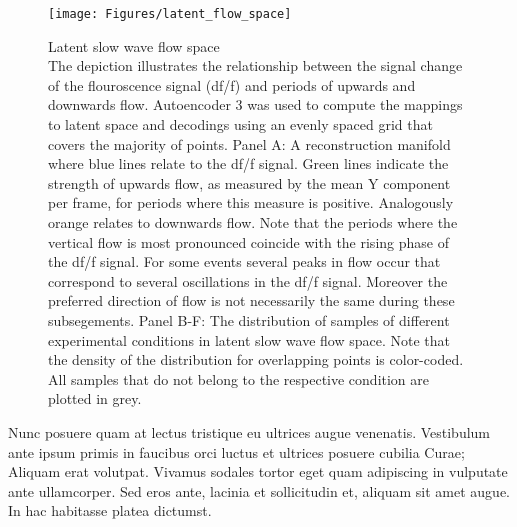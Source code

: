\begin{figure}[!htb]
\centering
\texttt{[image: Figures/latent\_flow\_space]}
\decoRule
\caption[Latent slow wave flow space]{Latent slow wave flow space\\ The depiction illustrates the relationship between the signal change of the flouroscence signal (df/f) and periods of upwards and downwards flow. Autoencoder 3 was used to compute the mappings to latent space and decodings using an evenly spaced grid that covers the majority of points. Panel A: A reconstruction manifold where blue lines relate to the df/f signal. Green lines indicate the strength of upwards flow, as measured by the mean Y component per frame, for periods where this measure is positive. Analogously orange relates to downwards flow. Note that the periods where the vertical flow is most pronounced coincide with the rising phase of the df/f signal. For some events several peaks in flow occur that correspond to several oscillations in the df/f signal. Moreover the preferred direction of flow is not necessarily the same during these subsegements. Panel B-F: The distribution of samples of different experimental conditions in latent slow wave flow space. Note that the density of the distribution for overlapping points is color-coded. All samples that do not belong to the respective condition are plotted in grey.}
\label{fig:latent_flow_space}
\end{figure}

Nunc posuere quam at lectus tristique eu ultrices augue venenatis. Vestibulum ante ipsum primis in faucibus orci luctus et ultrices posuere cubilia Curae; Aliquam erat volutpat. Vivamus sodales tortor eget quam adipiscing in vulputate ante ullamcorper. Sed eros ante, lacinia et sollicitudin et, aliquam sit amet augue. In hac habitasse platea dictumst.

